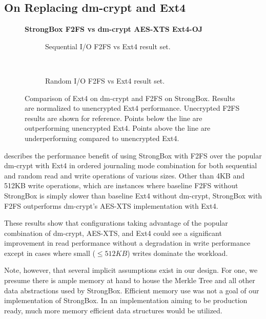 \subsection{On Replacing dm-crypt and Ext4}

\begin{figure}[ht]
    \textbf{StrongBox F2FS vs dm-crypt AES-XTS Ext4-OJ}\par\medskip
    \begin{subfigure}{\linewidth}
        \centering
        {}
        \caption{Sequential I/O F2FS vs Ext4 result set.}
       \label{fig:microbench-ext4-sequential}
    \end{subfigure}\\[1ex]
    \begin{subfigure}{\linewidth}
        \centering
        {}
        \caption{Random I/O F2FS vs Ext4 result set.}
       \label{fig:microbench-ext4-random}
    \end{subfigure}
    \caption{Comparison of Ext4 on dm-crypt and F2FS on StrongBox.
      Results are normalized to unencrypted Ext4 performance. Unecrypted F2FS
      results are shown for reference. Points below the line are outperforming
      unencrypted Ext4. Points above the line are underperforming compared
      to unencrypted Ext4.}
   \label{fig:microbench-ext4}
\end{figure}

 describes the performance benefit of using StrongBox
with F2FS over the popular dm-crypt with Ext4 in ordered journaling mode
combination for both sequential and random read and write operations of various
sizes. Other than 4KB and 512KB write operations, which are instances where
baseline F2FS without StrongBox is simply slower than baseline Ext4 without
dm-crypt, StrongBox with F2FS outperforms dm-crypt's AES-XTS implementation with
Ext4.

These results show that configurations taking advantage of the popular
combination of dm-crypt, AES-XTS, and Ext4 could see a significant improvement
in read performance without a degradation in write performance except in cases
where small ($\leq512KB$) writes dominate the workload.

Note, however, that several implicit assumptions exist in our design. For one,
we presume there is ample memory at hand to house the Merkle Tree and all other
data abstractions used by StrongBox. Efficient memory use was not a goal of our
implementation of StrongBox. In an implementation aiming to be production ready,
much more memory efficient data structures would be utilized.

